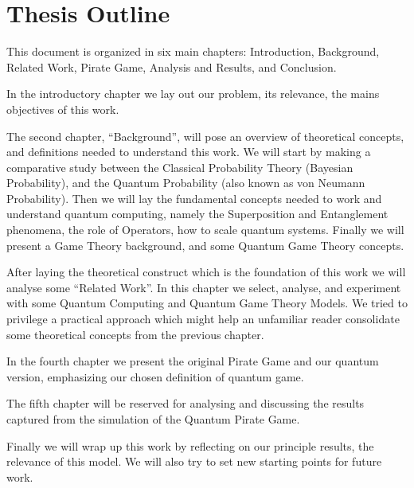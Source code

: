 \section{Thesis Outline}
\label{sec:int_outline}

This document is organized in six main chapters: Introduction, Background, Related Work, Pirate Game, Analysis and Results, and Conclusion. 

In the introductory chapter we lay out our problem, its relevance, the mains objectives of this work.

The second chapter, ``Background'', will pose an overview of theoretical concepts, and definitions needed to understand this work. We will start by making a comparative study between the Classical Probability Theory (Bayesian Probability), and the Quantum Probability (also known as von Neumann Probability). Then we will lay the fundamental concepts needed to work and understand quantum computing, namely the Superposition and Entanglement phenomena, the role of Operators, how to scale quantum systems. Finally we will present a Game Theory background, and some Quantum Game Theory concepts.

After laying the theoretical construct which is the foundation of this work we will analyse some ``Related Work''. In this chapter we select, analyse, and experiment with some Quantum Computing and Quantum Game Theory Models. We tried to privilege a practical approach which might help an unfamiliar reader consolidate some theoretical concepts from the previous chapter. 

In the fourth chapter we present the original Pirate Game and our quantum version, emphasizing our chosen definition of quantum game. 

The fifth chapter will be reserved for analysing and discussing the results captured from the simulation of the Quantum Pirate Game.

Finally we will wrap up this work by reflecting on our principle results, the relevance of this model. We will also try to set new starting points for future work. 